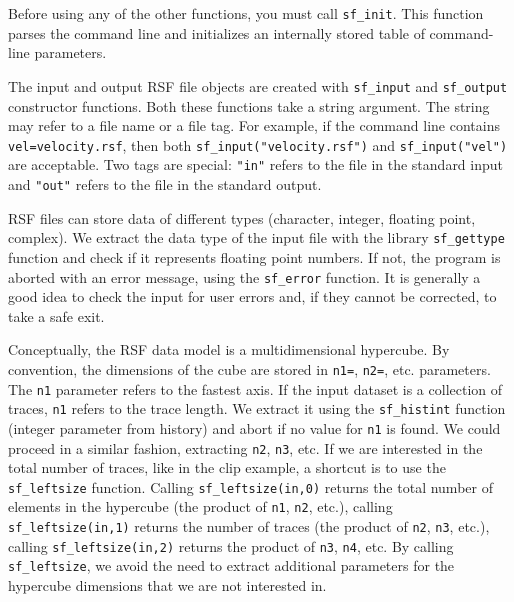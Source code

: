 
Before using any of the other functions, you must call \texttt{sf\_init}. This
function parses the command line and initializes an internally stored table of
command-line parameters.


The input and output RSF file objects are created with \texttt{sf\_input} and
\texttt{sf\_output} constructor functions. Both these functions take a string
argument. The string may refer to a file name or a file tag. For example, if
the command line contains \texttt{vel=velocity.rsf}, then both
\texttt{sf\_input("velocity.rsf")} and \texttt{sf\_input("vel")} are
acceptable. Two tags are special: \texttt{"in"} refers to the file in the
standard input and \texttt{"out"} refers to the file in the standard
output. 

 RSF
files can store data of different types (character, integer, floating point,
complex). We extract the data type of the input file with the library
\texttt{sf\_gettype} function and check if it represents floating point
numbers. If not, the program is aborted with an error message, using the
\texttt{sf\_error} function.  It is generally a good idea to check the input
for user errors and, if they cannot be corrected, to take a safe exit.


Conceptually, the RSF data model is a multidimensional hypercube. By
convention, the dimensions of the cube are stored in \texttt{n1=},
\texttt{n2=}, etc. parameters. The \texttt{n1} parameter refers to the fastest
axis. If the input dataset is a collection of traces, \texttt{n1} refers to
the trace length. We extract it using the \texttt{sf\_histint} function
(integer parameter from history) and abort if no value for \texttt{n1} is
found. We could proceed in a similar fashion, extracting \texttt{n2},
\texttt{n3}, etc. If we are interested in the total number of traces, like in
the clip example, a shortcut is to use the \texttt{sf\_leftsize}
function. Calling \texttt{sf\_leftsize(in,0)} returns the total number of
elements in the hypercube (the product of \texttt{n1}, \texttt{n2}, etc.),
calling \texttt{sf\_leftsize(in,1)} returns the number of traces (the product
of \texttt{n2}, \texttt{n3}, etc.), calling \texttt{sf\_leftsize(in,2)}
returns the product of \texttt{n3}, \texttt{n4}, etc. By calling 
\texttt{sf\_leftsize}, we avoid the need to extract additional parameters for
the hypercube dimensions that we are not interested in.


